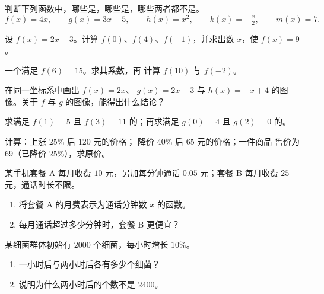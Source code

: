 \begin{exercise}[$\star$]\label{exo:g9:linfunc:1}
判断下列函数中，哪些是，哪些是，哪些两者都不是。
\[
f(x) = 4x, \qquad
g(x) = 3x - 5, \qquad
h(x) = x^2, \qquad
k(x) = -\tfrac x2, \qquad
m(x) = 7 .
\]
\end{exercise}

\begin{exercise}[$\star$]\label{exo:g9:linfunc:2}
设 $f(x) = 2x - 3$。计算 $f(0)$、$f(4)$、$f(-1)$，并求出数
$x$，使 $f(x) = 9$。
\end{exercise}

\begin{exercise}[$\star$]\label{exo:g9:linfunc:3}
一个满足 $f(6) = 15$。求其系数，再
计算 $f(10)$ 与 $f(-2)$。
\end{exercise}

\begin{exercise}[$\star$]\label{exo:g9:linfunc:4}
在同一坐标系中画出 $f(x) = 2x$、
$g(x) = 2x + 3$ 与 $h(x) = -x + 4$ 的图像。关于
$f$ 与 $g$ 的图像，能得出什么结论？
\end{exercise}

\begin{exercise}[$\star$]\label{exo:g9:linfunc:5}
求满足 $f(1) = 5$ 且 $f(3) = 11$ 的；再求满足
$g(0) = 4$ 且 $g(2) = 0$ 的。
\end{exercise}

\begin{exercise}[$\star\star$]\label{exo:g9:linfunc:6}
计算：上涨 $25\%$ 后 $120$ 元的价格；
降价 $40\%$ 后 $65$ 元的价格；一件商品
售价为 $69$（已降价 $25\%$），求原价。
\end{exercise}

\begin{exercise}[$\star\star$]\label{exo:g9:linfunc:7}
某手机套餐 A 每月收费 $10$ 元，另加每分钟通话 $0.05$ 元；套餐
B 每月收费 $25$ 元，通话时长不限。
\begin{enumerate}
  \item 将套餐 A 的月费表示为通话分钟数
        $x$ 的函数。
  \item 每月通话超过多少分钟时，套餐 B 更便宜？
\end{enumerate}
\end{exercise}

\begin{exercise}[$\star\star$]\label{exo:g9:linfunc:8}
某细菌群体初始有 $2000$ 个细菌，每小时增长 $10\%$。
\begin{enumerate}
  \item 一小时后与两小时后各有多少个细菌？
  \item 说明为什么两小时后的个数不是 $2400$。
\end{enumerate}
\end{exercise}

